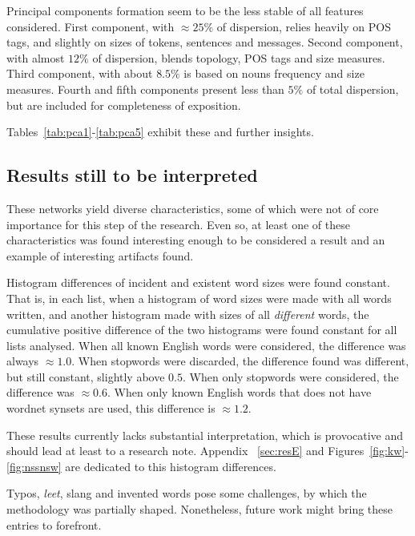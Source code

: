 \documentclass[%
 aip,
 jmp,%
 amsmath,amssymb,
 reprint,%
]{revtex4-1}
\begin{document}
Principal components formation seem to be the less stable of all features considered. First component, with $\approx 25\%$ of dispersion, relies heavily on POS tags, and slightly on sizes of tokens, sentences and messages. Second component, with almost $12\%$ of dispersion, blends topology, POS tags and size measures. Third component, with about $8.5\%$ is based on nouns frequency and size measures. Fourth and fifth components present less than $5\%$ of total dispersion, but are included for completeness of exposition.

Tables~\ref{tab:pca1}-\ref{tab:pca5} exhibit these and further insights.

\subsection{Results still to be interpreted}\label{subsec:sii}
These networks yield diverse characteristics, some of which were not of core importance for this step of the research. Even so, at least one of these characteristics was found interesting enough to be considered a result and an example of interesting artifacts found.

Histogram differences of incident and existent word sizes were found constant. That is, in each list, when a histogram of word sizes were made with all words written, and another histogram made with sizes of all \emph{different} words, the cumulative positive difference of the two histograms were found constant for all lists analysed. When all known English words were considered, the difference was always $\approx 1.0$. When stopwords were discarded, the difference found was different, but still constant, slightly above $0.5$. When only stopwords were considered, the difference was $\approx 0.6$. When only known English words that does not have wordnet synsets are used, this difference is $\approx 1.2$.

These results currently lacks substantial interpretation, which is provocative and should lead at least to a research note. Appendix ~\ref{sec:resE} and Figures~\ref{fig:kw}-\ref{fig:nssnsw} are dedicated to this histogram differences.

Typos, \emph{leet},
slang and invented words
pose some challenges,
by which the methodology was partially shaped.
Nonetheless, future work might bring these entries
to forefront.
\end{document}
